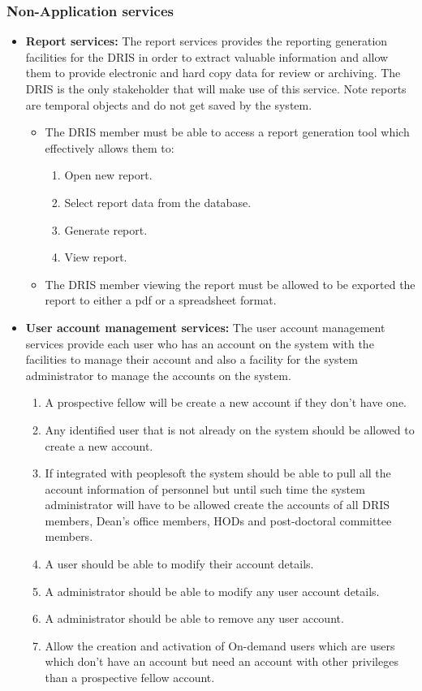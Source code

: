 \documentclass[12pt]{article}
\begin{document}
\subsubsection{Non-Application services}
	\begin{itemize}
		\item\textbf{Report services:}
		The report services provides the reporting generation facilities for the DRIS in order to extract valuable information and allow them to provide electronic and hard copy data for review or archiving. The DRIS is the only stakeholder that will make use of this service. Note reports are temporal objects and do not get saved by the system.
		\begin{itemize}
			\item The DRIS member must be able to access a report generation tool which effectively allows them to:
			\begin{enumerate}
				\item Open new report.
				\item Select report data from the database.
				\item Generate report.
				\item View report.
			\end{enumerate}
			\item The DRIS member viewing the report must be allowed to be exported the report to either a pdf or a spreadsheet format.	
		\end{itemize}

		\item\textbf{User account management services:}
		The user account management services provide each user who has an account on the system with the facilities to manage their account and also a facility for the system administrator to manage the accounts on the system.
		\begin{enumerate}
			\item A prospective fellow will be create a new account if they don't have one.
			\item Any identified user that is not already on the system should be allowed to create a new account.
			\item If integrated with peoplesoft the system should be able to pull all the account information of personnel but until such time the system administrator will have to be allowed create the accounts of all DRIS members, Dean's office members, HODs and post-doctoral committee members.	
			\item A user should be able to modify their account details.
			\item A administrator should be able to modify any user account details.
			\item A administrator should be able to remove any user account.
			\item Allow the creation and activation of On-demand users which are users which don't have an account but need an account with other privileges than a prospective fellow account.
		\end{enumerate}
	

\end{itemize}
\end{document}
